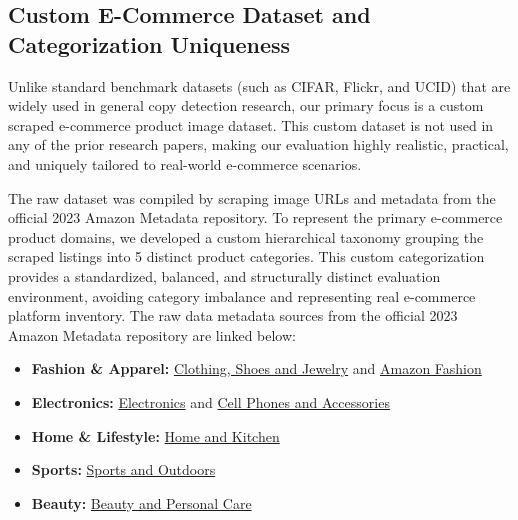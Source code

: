 \documentclass[11pt,a4paper]{article}
\begin{document}
\subsection{Custom E-Commerce Dataset and Categorization Uniqueness}
Unlike standard benchmark datasets (such as CIFAR, Flickr, and UCID) that are widely used in general copy detection research, our primary focus is a custom scraped e-commerce product image dataset. This custom dataset is not used in any of the prior research papers, making our evaluation highly realistic, practical, and uniquely tailored to real-world e-commerce scenarios.

The raw dataset was compiled by scraping image URLs and metadata from the official 2023 Amazon Metadata repository. To represent the primary e-commerce product domains, we developed a custom hierarchical taxonomy grouping the scraped listings into 5 distinct product categories. This custom categorization provides a standardized, balanced, and structurally distinct evaluation environment, avoiding category imbalance and representing real e-commerce platform inventory. The raw data metadata sources from the official 2023 Amazon Metadata repository are linked below:

\begin{itemize}
    \item \textbf{Fashion \& Apparel:} \href{https://mcauleylab.ucsd.edu/public_datasets/data/amazon_2023/raw/meta_categories/meta_Clothing_Shoes_and_Jewelry.jsonl.gz}{Clothing, Shoes and Jewelry} and \href{https://mcauleylab.ucsd.edu/public_datasets/data/amazon_2023/raw/meta_categories/meta_Amazon_Fashion.jsonl.gz}{Amazon Fashion}
    \item \textbf{Electronics:} \href{https://mcauleylab.ucsd.edu/public_datasets/data/amazon_2023/raw/meta_categories/meta_Electronics.jsonl.gz}{Electronics} and \href{https://mcauleylab.ucsd.edu/public_datasets/data/amazon_2023/raw/meta_categories/meta_Cell_Phones_and_Accessories.jsonl.gz}{Cell Phones and Accessories}
    \item \textbf{Home \& Lifestyle:} \href{https://mcauleylab.ucsd.edu/public_datasets/data/amazon_2023/raw/meta_categories/meta_Home_and_Kitchen.jsonl.gz}{Home and Kitchen}
    \item \textbf{Sports:} \href{https://mcauleylab.ucsd.edu/public_datasets/data/amazon_2023/raw/meta_categories/meta_Sports_and_Outdoors.jsonl.gz}{Sports and Outdoors}
    \item \textbf{Beauty:} \href{https://mcauleylab.ucsd.edu/public_datasets/data/amazon_2023/raw/meta_categories/meta_Beauty_and_Personal_Care.jsonl.gz}{Beauty and Personal Care}
\end{itemize}
\end{document}
